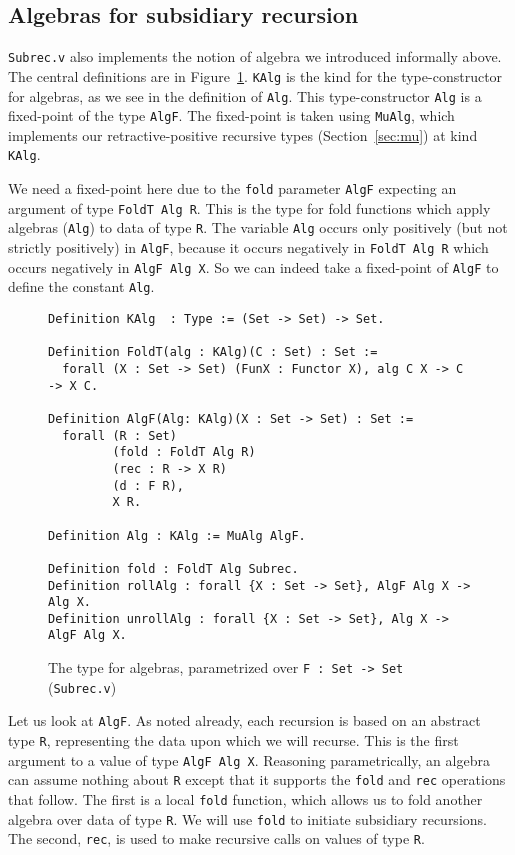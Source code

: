 \documentclass[a4paper,USenglish]{lipics-v2021}
\begin{document}
\subsection{Algebras for subsidiary recursion}

\verb|Subrec.v| also implements the notion of algebra we introduced
informally above.  The central definitions are in
Figure~\ref{fig:algf}.  \verb|KAlg| is the kind for the
type-constructor for algebras, as we see in the definition of
\verb|Alg|.  This type-constructor \verb|Alg| is a fixed-point of the
type \verb|AlgF|.  The fixed-point is taken using \verb|MuAlg|, which
implements our retractive-positive recursive types
(Section~\ref{sec:mu}) at kind \verb|KAlg|.

We need a fixed-point here due to the \verb|fold| parameter
\verb|AlgF| expecting an argument of type \verb|FoldT Alg R|.  This is the type for fold functions which
apply algebras (\verb|Alg|) to data of type \verb|R|.  The variable \verb|Alg| occurs only positively (but not
strictly positively) in \verb|AlgF|, because it occurs negatively in
\verb|FoldT Alg R| which occurs negatively in \verb|AlgF Alg X|.  So
we can indeed take a fixed-point of \verb|AlgF| to define the constant
\verb|Alg|.

\begin{figure}
\begin{verbatim}
Definition KAlg  : Type := (Set -> Set) -> Set.

Definition FoldT(alg : KAlg)(C : Set) : Set :=
  forall (X : Set -> Set) (FunX : Functor X), alg C X -> C -> X C.

Definition AlgF(Alg: KAlg)(X : Set -> Set) : Set :=
  forall (R : Set)
         (fold : FoldT Alg R)
         (rec : R -> X R)
         (d : F R),
         X R.

Definition Alg : KAlg := MuAlg AlgF.

Definition fold : FoldT Alg Subrec.
Definition rollAlg : forall {X : Set -> Set}, AlgF Alg X -> Alg X.
Definition unrollAlg : forall {X : Set -> Set}, Alg X -> AlgF Alg X.
\end{verbatim}
\caption{The type for algebras, parametrized over \texttt{F : Set -> Set} (\texttt{Subrec.v})}
\label{fig:algf}
\end{figure}


Let us look at \verb|AlgF|.  As noted already, each recursion is based
on an abstract type \verb|R|, representing the data upon which we will
recurse.  This is the first argument to a value of type
\verb|AlgF Alg X|.  Reasoning parametrically, an algebra can assume
nothing about \verb|R| except that it supports the
\verb|fold| and \verb|rec| operations that follow. The first is a local
\verb|fold| function, which allows us to fold another algebra over data
of type \verb|R|.  We will use \verb|fold| to initiate subsidiary
recursions.  The second, \verb|rec|, is used to make recursive calls
on values of type \verb|R|.
\end{document}
